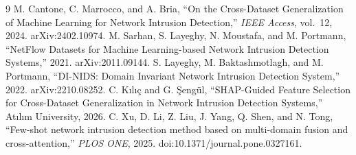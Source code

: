 \documentclass[conference]{IEEEtran}
\begin{document}
\begin{thebibliography}{9}
 M. Cantone, C. Marrocco, and A. Bria, ``On the Cross-Dataset Generalization of
Machine Learning for Network Intrusion Detection,'' \emph{IEEE Access}, vol.~12, 2024. arXiv:2402.10974.
 M. Sarhan, S. Layeghy, N. Moustafa, and M. Portmann, ``NetFlow Datasets for
Machine Learning-based Network Intrusion Detection Systems,'' 2021. arXiv:2011.09144.
 S. Layeghy, M. Baktashmotlagh, and M. Portmann, ``DI-NIDS: Domain Invariant Network
Intrusion Detection System,'' 2022. arXiv:2210.08252.
 C. Kılıç and G. Şengül, ``SHAP-Guided Feature Selection for Cross-Dataset
Generalization in Network Intrusion Detection Systems,'' Atılım University, 2026.
 C. Xu, D. Li, Z. Liu, J. Yang, Q. Shen, and N. Tong, ``Few-shot network intrusion
detection method based on multi-domain fusion and cross-attention,'' \emph{PLOS ONE}, 2025.
doi:10.1371/journal.pone.0327161.
\end{thebibliography}
\end{document}
